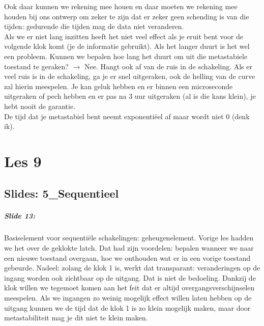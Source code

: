 \documentclass[10pt,a4paper]{book}
\begin{document}
Ook daar kunnen we rekening mee houen en daar moeten we rekening mee houden bij ons ontwerp om zeker te zijn dat er zeker geen schending is van die tijden: gedurende die tijden mag de data niet veranderen.\\
Als we er niet lang inzitten heeft het niet veel effect als je eruit bent voor de volgende klok komt (je de informatie gebruikt). Als het langer duurt is het wel een probleem. Kunnen we bepalen hoe lang het duurt om uit die metastabiele toestand te geraken? $\rightarrow$ Nee. Hangt ook af van de ruis in de schakeling. Als er veel ruis is in de schakeling, ga je er snel uitgeraken, ook de helling van de curve zal hierin meespelen. Je kan geluk hebben en er binnen een microseconde uitgeraken of pech hebben en er pas na 3 uur uitgeraken (al is die kans klein), je hebt nooit de garantie.\\
De tijd dat je metastabiel bent neemt exponenti\"eel af maar wordt niet 0 (denk ik).

\chapter{Les 9}

\section{Slides: 5\_Sequentieel} 

\paragraph{Slide 13:} Basiselement voor sequenti\"ele schakelingen: geheugenelement. Vorige les hadden we het over de geklokte latch. Dat had zijn voordelen: bepalen wanneer we naar een nieuwe toestand overgaan, hoe we onthouden wat er in een vorige toestand gebeurde. Nadeel: zolang de klok 1 is, werkt dat transparant: veranderingen op de ingang worden ook zichtbaar op de uitgang. Dat is niet de bedoeling. Dankzij de klok willen we tegemoet komen aan het feit dat er altijd overgangsverschijnselen meespelen. Als we ingangen zo weinig mogelijk effect willen laten hebben op de uitgang kunnen we de tijd dat de klok 1 is zo klein mogelijk maken, maar door metastabiliteit mag je dit niet te klein maken.
\end{document}
